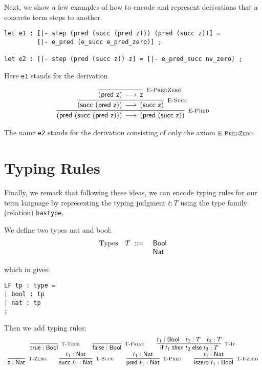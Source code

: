 Next,  we show a few examples of  how to encode and represent derivations that a
concrete term steps to another.

\begin{lstlisting}
let e1 : [|- step (pred (succ (pred z))) (pred (succ z))] =
         [|- e_pred (e_succ e_pred_zero)] ;

let e2 : [|- step (pred (succ z)) z] = [|- e_pred_succ nv_zero] ;
\end{lstlisting}

Here \lstinline!e1! stands for the derivation

\[
\begin{array}{c}
\infer[\EPred]{(\tmpred {(\tmsucc {(\tmpred {\tmzero})})}) \Steps (\tmpred {(\tmsucc {\tmzero})})}
{\infer[\ESucc]{(\tmsucc {(\tmpred {\tmzero})}) \Steps (\tmsucc {\tmzero} )}
 {\infer[\EPredZ]{(\tmpred {\tmzero}) \Steps \tmzero}{}}
}
\end{array}
\]

The name \lstinline!e2! stands for the derivation consisting of only
the axiom $\textsc{\footnotesize E-PredZero}$.

\section{Typing Rules}

Finally, we remark that following these ideas, we can encode typing rules for
our term language by representing the typing judgment $t : T$ using the type
family (relation) \lstinline!hastype!.

We define two types nat and bool:
\[
\begin{array}{lll}
\mbox{Types} & T \;\mathrel{::=}\; & \textsf{Bool} \\
             &          & \textsf{Nat}
\end{array}
\]

which in \beluga gives:
\begin{lstlisting}
LF tp : type =
| bool : tp
| nat : tp
;
\end{lstlisting}

Then we add typing rules:
\[
\begin{array}{c}
  \infer[\TTrue]{\tmtrue \hastype \Bool}{} \qquad
  \infer[\TFalse]{\tmfalse \hastype \Bool}{} \qquad
  \infer[\TIf]{\tmif{t_1}{t_2}{t_3} \hastype T}{t_1 \hastype \Bool & t_2 \hastype T & t_3 \hastype T}
\\
  \infer[\TZero]{\tmzero \hastype \Nat}{}\qquad
  \infer[\TSucc]{\tmsucc t_1 \hastype \Nat}{t_1 \hastype \Nat} \qquad
  \infer[\TPred]{\tmpred t_1 \hastype \Nat}{t_1 \hastype \Nat} \qquad
  \infer[\TIsZero]{\tmiszero t_1 \hastype \Bool}{t_1 \hastype \Nat}
\\
\end{array}
\]

